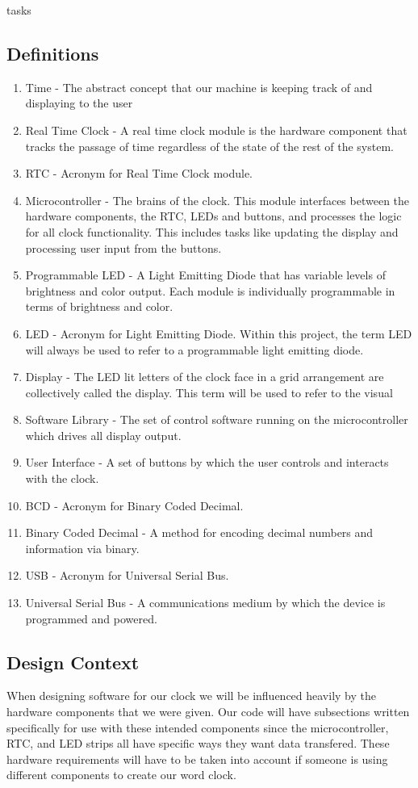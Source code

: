 tasks\documentclass[onecolumn, draftclsnofoot,10pt, compsoc]{IEEEtran}
\begin{document}
\subsection{Definitions}
\begin{enumerate}[]
  \item Time - The abstract concept that our machine is keeping track of and displaying to the user
  \item Real Time Clock - A real time clock module is the hardware component that tracks the passage
  of time regardless of the state of the rest of the system.
  \item RTC - Acronym for Real Time Clock module.
  \item Microcontroller - The brains of the clock. This module interfaces between the hardware
  components, the RTC, LEDs and buttons, and processes the logic for all clock functionality.
  This includes tasks like updating the display and processing user input from the buttons.
  \item Programmable LED - A Light Emitting Diode that has variable levels of brightness and
  color output. Each module is individually programmable in terms of brightness and color.
  \item LED - Acronym for Light Emitting Diode. Within this project, the term LED will always
  be used to refer to a programmable light emitting diode.
  \item Display - The LED lit letters of the clock face in a grid arrangement are collectively
  called the display. This term will be used to refer to the visual
  \item Software Library - The set of control software running on the microcontroller which drives all display output.
  \item User Interface - A set of buttons by which the user controls and interacts with the clock.
  \item BCD - Acronym for Binary Coded Decimal.
  \item Binary Coded Decimal - A method for encoding decimal numbers and information via binary.
  \item USB - Acronym for Universal Serial Bus.
  \item Universal Serial Bus - A communications medium by which the device is programmed and  powered.
\end{enumerate}

\newpage

\subsection{Design Context}
When designing software for our clock we will be influenced heavily by the hardware components that we were given.
Our code will have subsections written specifically for use with these intended components since the microcontroller, RTC, and LED strips all have specific ways they want data transfered.
These hardware requirements will have to be taken into account if someone is using different components to create our word clock.
\end{document}
